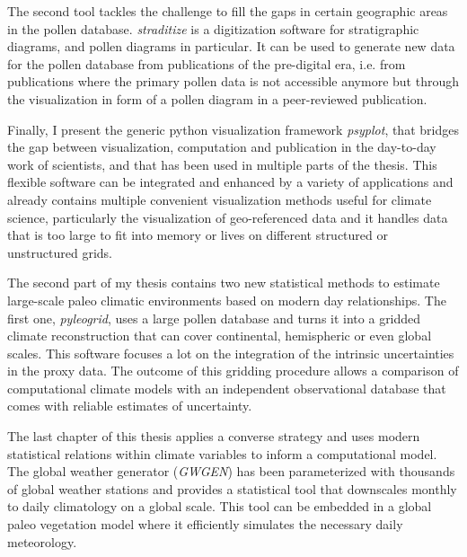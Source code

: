 \begin{thesisabstract}[]
The second tool tackles the challenge to fill the gaps in certain geographic areas in the pollen database. \textit{straditize} is a digitization software for stratigraphic diagrams, and pollen diagrams in particular. It can be used to generate new data for the pollen database from publications of the pre-digital era, i.e. from publications where the primary pollen data is not accessible anymore but through the visualization in form of a pollen diagram in a peer-reviewed publication.

Finally, I present the generic python visualization framework \textit{psyplot}, that bridges the gap between visualization, computation and publication in the day-to-day work of scientists, and that has been used in multiple parts of the thesis. This flexible software can be integrated and enhanced by a variety of applications and already contains multiple convenient visualization methods useful for climate science, particularly the visualization of geo-referenced data and it handles data that is too large to fit into memory or lives on different structured or unstructured grids.

The second part of my thesis contains two new statistical methods to estimate large-scale paleo climatic environments based on modern day relationships. The first one, \textit{pyleogrid}, uses a large pollen database and turns it into a gridded climate reconstruction that can cover continental, hemispheric or even global scales. This software focuses a lot on the integration of the intrinsic uncertainties in the proxy data. The outcome of this gridding procedure allows a comparison of computational climate models with an independent observational database that comes with reliable estimates of uncertainty.

The last chapter of this thesis applies a converse strategy and uses modern statistical relations within climate variables to inform a computational model. The global weather generator (\textit{GWGEN}) has been parameterized with thousands of global weather stations and provides a statistical tool that downscales monthly to daily climatology on a global scale. This tool can be embedded in a global paleo vegetation model where it efficiently simulates the necessary daily meteorology.
\end{thesisabstract}

\cleardoublepage

\let\Oldunivname\univname
\let\Olddeptname\deptname
\let\Oldfacname\facname
\let\Olddegreename\degreename


